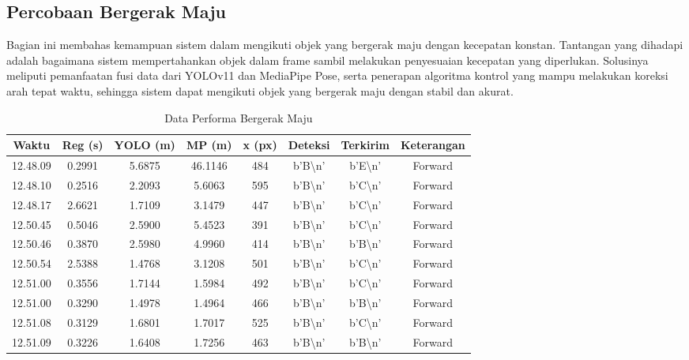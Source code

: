 \newpage
\subsection{Percobaan Bergerak Maju}
\label{subsec:percobaanbergerakmaju}

Bagian ini membahas kemampuan sistem dalam mengikuti objek yang bergerak maju dengan kecepatan konstan. Tantangan yang dihadapi adalah bagaimana sistem mempertahankan objek dalam frame sambil melakukan penyesuaian kecepatan yang diperlukan. Solusinya meliputi pemanfaatan fusi data dari YOLOv11 dan MediaPipe Pose, serta penerapan algoritma kontrol yang mampu melakukan koreksi arah tepat waktu, sehingga sistem dapat mengikuti objek yang bergerak maju dengan stabil dan akurat.

\begin{table}[H]
    \centering
    \caption{Data Performa Bergerak Maju}
    \label{tab:performa_bergerak_maju}
    \begin{tabular}{|c|c|c|c|c|c|c|c|}
    \hline
    Waktu & Reg (s) & YOLO (m) & MP (m) & x (px) & Deteksi & Terkirim & Keterangan \\ \hline
    12.48.09 & 0.2991 & 5.6875 & 46.1146 & 484 & b'B\textbackslash n' & b'E\textbackslash n' & Forward \\ \hline
    12.48.10 & 0.2516 & 2.2093 & 5.6063 & 595 & b'B\textbackslash n' & b'C\textbackslash n' & Forward \\ \hline
    12.48.17 & 2.6621 & 1.7109 & 3.1479 & 447 & b'B\textbackslash n' & b'C\textbackslash n' & Forward \\ \hline
    12.50.45 & 0.5046 & 2.5900 & 5.4523 & 391 & b'B\textbackslash n' & b'C\textbackslash n' & Forward \\ \hline
    12.50.46 & 0.3870 & 2.5980 & 4.9960 & 414 & b'B\textbackslash n' & b'B\textbackslash n' & Forward \\ \hline
    12.50.54 & 2.5388 & 1.4768 & 3.1208 & 501 & b'B\textbackslash n' & b'C\textbackslash n' & Forward \\ \hline
    12.51.00 & 0.3556 & 1.7144 & 1.5984 & 492 & b'B\textbackslash n' & b'C\textbackslash n' & Forward \\ \hline
    12.51.00 & 0.3290 & 1.4978 & 1.4964 & 466 & b'B\textbackslash n' & b'B\textbackslash n' & Forward \\ \hline
    12.51.08 & 0.3129 & 1.6801 & 1.7017 & 525 & b'B\textbackslash n' & b'C\textbackslash n' & Forward \\ \hline
    12.51.09 & 0.3226 & 1.6408 & 1.7256 & 463 & b'B\textbackslash n' & b'B\textbackslash n' & Forward \\ \hline

\end{tabular}
\end{table}
